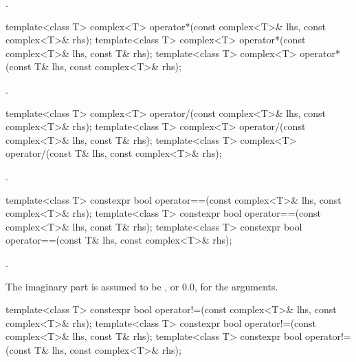 \begin{itemdescr}
\pnum
\returns
{}.
\end{itemdescr}

%
\begin{itemdecl}
template<class T>
  complex<T> operator*(const complex<T>& lhs, const complex<T>& rhs);
template<class T> complex<T> operator*(const complex<T>& lhs, const T& rhs);
template<class T> complex<T> operator*(const T& lhs, const complex<T>& rhs);
\end{itemdecl}

\begin{itemdescr}
\pnum
\returns
{}.
\end{itemdescr}

%
%
\begin{itemdecl}
template<class T>
  complex<T> operator/(const complex<T>& lhs, const complex<T>& rhs);
template<class T> complex<T> operator/(const complex<T>& lhs, const T& rhs);
template<class T> complex<T> operator/(const T& lhs, const complex<T>& rhs);
\end{itemdecl}

\begin{itemdescr}
\pnum
\returns
{}.
\end{itemdescr}

%
\begin{itemdecl}
template<class T>
  constexpr bool operator==(const complex<T>& lhs, const complex<T>& rhs);
template<class T> constexpr bool operator==(const complex<T>& lhs, const T& rhs);
template<class T> constexpr bool operator==(const T& lhs, const complex<T>& rhs);
\end{itemdecl}

\begin{itemdescr}
\pnum
\returns
{}.

\pnum
\remarks
The imaginary part is assumed to be
,
or 0.0, for the
arguments.
\end{itemdescr}

%
\begin{itemdecl}
template<class T>
  constexpr bool operator!=(const complex<T>& lhs, const complex<T>& rhs);
template<class T> constexpr bool operator!=(const complex<T>& lhs, const T& rhs);
template<class T> constexpr bool operator!=(const T& lhs, const complex<T>& rhs);
\end{itemdecl}

